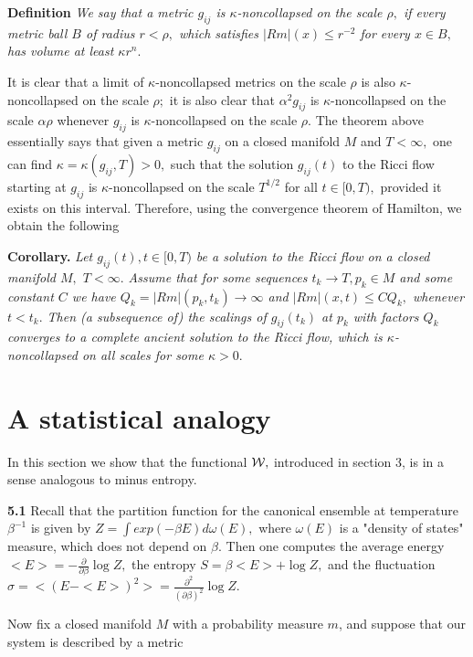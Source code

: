 \documentclass[12pt]{article}
\newcommand{\cW}{{\cal W}}
\theoremstyle{plain}
{\swapnumbers
\newtheorem{thm}{Theorem}[section]
\newtheorem{cor}[thm]{Corollary}
\newtheorem{lem}[thm]{Lemma}
\newtheorem{prop}[thm]{Proposition}
}
\theoremstyle{definition}
{\swapnumbers
\newtheorem{defn}[thm]{Definition}
\newtheorem{nota}[thm]{Notation}
\newtheorem{parag}[thm]{}
\newtheorem*{parstr}{\addtocounter{thm}{1}\thesection.\arabic{thm}*}
\newtheorem*{intropar}{\addtocounter{thm}{1}\arabic{thm}}
}
\theoremstyle{remark} {\swapnumbers
\newtheorem{rem}[thm]{Remark}
\newtheorem{exam}[thm]{Example}
\newtheorem{lemma}[thm]{Lemma}
\newtheorem{claim}[thm]{Claim}
}
\numberwithin{equation}{section}
\begin{document}
\par \begin{parag} {\bf Definition}  {\it We say that a metric $g_{ij}$ is
$\kappa$-noncollapsed on the scale $\rho,$ if every metric ball
$B$ of radius $r<\rho,$ which satisfies $|Rm|(x)\le r^{-2}$ for
every $x\in B,$ has volume at least $\kappa r^n.$} \par It is
clear that a limit of $\kappa$-noncollapsed metrics on the scale
$\rho$ is also $\kappa$-noncollapsed on the scale $\rho;$ it is
also clear that $\alpha^2g_{ij}$ is $\kappa$-noncollapsed on the
scale $\alpha\rho$ whenever $g_{ij}$ is $\kappa$-noncollapsed on
the scale $\rho.$ The theorem above essentially says that given a
metric $g_{ij}$ on a closed manifold $M$ and $T<\infty,$ one can
find $\kappa=\kappa(g_{ij},T)>0,$ such that the solution
$g_{ij}(t)$ to the Ricci flow starting at $g_{ij}$ is
$\kappa$-noncollapsed on the scale $T^{1/2}$ for all $t\in [0,T),$
provided it exists on this interval. Therefore, using the
convergence theorem of Hamilton, we obtain the following
\par {\bf Corollary.}  {\it Let $g_{ij}(t), t\in [0,T)$ be a solution to the
Ricci flow on a closed manifold $M,$ $T<\infty.$ Assume that for
some sequences $t_k\to T, p_k\in M$ and some constant $C$  we have
$Q_k=|Rm|(p_k,t_k)\to\infty$ and $ |Rm|(x,t)\le CQ_k,$ whenever
$t<t_k.$ Then (a subsequence of) the scalings of $g_{ij}(t_k)$ at
$p_k$ with factors $Q_k$ converges to a complete ancient solution
to the Ricci flow, which is $\kappa$-noncollapsed on all scales
for some $\kappa>0.$}  \end{parag}  \section {A statistical
analogy} In this section we show that the functional $\cW,$
introduced in section 3, is in a sense analogous to minus entropy.
\par {\bf 5.1} Recall that the partition function for the canonical
ensemble at temperature $\beta^{-1}$ is given by
$Z=\int{exp(-\beta E)d\omega(E)},$ where $\omega(E)$ is a "density
of states" measure, which does not depend on $\beta.$ Then one
computes the average energy
$<E>=-\frac{\partial}{\partial\beta}\log Z,$ the entropy
$S=\beta<E>+\log Z,$ and the fluctuation
$\sigma=<(E-<E>)^2>=\frac{\partial^2}{(\partial\beta)^2}\log Z.$
\par Now fix a closed manifold $M$ with a probability measure $m$,
and suppose that our system is described by a metric
\end{document}
